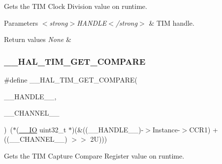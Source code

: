 Gets the T\+IM Clock Division value on runtime. 


\begin{DoxyParams}{Parameters}
{\em $<$strong$>$\+H\+A\+N\+D\+L\+E$<$/strong$>$} & T\+IM handle. \\
\hline
\end{DoxyParams}

\begin{DoxyRetVals}{Return values}
{\em None} & \\
\hline
\end{DoxyRetVals}
\mbox{\label{group___t_i_m___exported___macros_gaa40722f56910966e1da5241b610eed84}} 
\subsubsection{\texorpdfstring{\+\_\+\+\_\+\+H\+A\+L\+\_\+\+T\+I\+M\+\_\+\+G\+E\+T\+\_\+\+C\+O\+M\+P\+A\+RE}{\_\_HAL\_TIM\_GET\_COMPARE}}
{\footnotesize\ttfamily \#define \+\_\+\+\_\+\+H\+A\+L\+\_\+\+T\+I\+M\+\_\+\+G\+E\+T\+\_\+\+C\+O\+M\+P\+A\+RE(\begin{DoxyParamCaption}\item[{}]{\+\_\+\+\_\+\+H\+A\+N\+D\+L\+E\+\_\+\+\_\+,  }\item[{}]{\+\_\+\+\_\+\+C\+H\+A\+N\+N\+E\+L\+\_\+\+\_\+ }\end{DoxyParamCaption})~($\ast$(\hyperlink{core__sc300_8h_aec43007d9998a0a0e01faede4133d6be}{\+\_\+\+\_\+\+IO} uint32\+\_\+t $\ast$)(\&((\+\_\+\+\_\+\+H\+A\+N\+D\+L\+E\+\_\+\+\_\+)-\/$>$Instance-\/$>$C\+C\+R1) + ((\+\_\+\+\_\+\+C\+H\+A\+N\+N\+E\+L\+\_\+\+\_\+) $>$$>$ 2\+U)))}



Gets the T\+IM Capture Compare Register value on runtime. 


